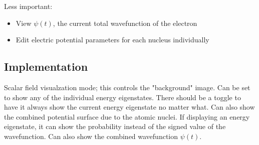 \documentclass[12pt]{article}
\begin{document}
Less important:
\begin{itemize}
    \item View $\psi(t)$, the current total wavefunction of the electron
    \item Edit electric potential parameters for each nucleus individually
\end{itemize}

\subsection{Implementation}
Scalar field visualzation mode; this controls the "background" image. Can be set to show any of the individual energy eigenstates. There should be a toggle to have it always show the current energy eigenstate no matter what. Can also show the combined potential surface due to the atomic nuclei. If displaying an energy eigenstate, it can show the probability instead of the signed value of the wavefunction. Can also show the combined wavefunction $\psi(t)$.
\end{document}
